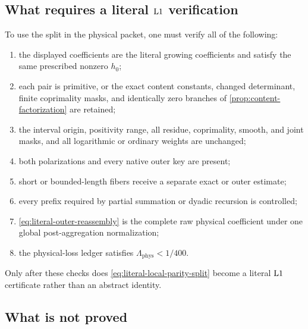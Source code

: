 \subsection{What requires a literal
\texorpdfstring{\(\mathrm{L1}\)}{L1} verification}

To use the split in the physical packet, one must verify all of the
following:
\begin{enumerate}[label=(\alph*),leftmargin=2.2em]
\item the displayed coefficients are the literal growing
coefficients and satisfy the same prescribed nonzero \(h_0\);
\item each pair is primitive, or the exact content constants,
changed determinant, finite coprimality masks, and identically zero
branches of \cref{prop:content-factorization} are retained;
\item the interval origin, positivity range, all residue,
coprimality, smooth, and joint masks, and all logarithmic or ordinary
weights are unchanged;
\item both polarizations and every native outer key are present;
\item short or bounded-length fibers receive a separate exact or
outer estimate;
\item every prefix required by partial summation or dyadic recursion
is controlled;
\item \eqref{eq:literal-outer-reassembly} is the complete raw
physical coefficient under one global post-aggregation
normalization;
\item the physical-loss ledger satisfies
\(\Lambda_{\mathrm{phys}}<1/400\).
\end{enumerate}
Only after these checks does
\eqref{eq:literal-local-parity-split} become a literal \(\mathrm{L1}\)
certificate rather than an abstract identity.

\subsection{What is not proved}

